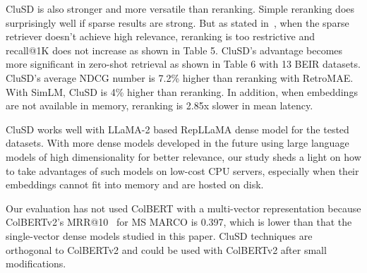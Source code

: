 CluSD is also stronger and more versatile than reranking. 
Simple reranking does surprisingly well if sparse results are strong. But as stated in~\cite{2022CIKM-MacAvaneyGraphReRank,2023SIGIR-LADR},
when the sparse retriever doesn’t achieve high relevance, reranking is too 
restrictive and recall@1K does not increase as shown in Table 5. 
CluSD’s advantage becomes more significant in zero-shot retrieval as shown in Table 6 with 13 BEIR datasets. CluSD’s average NDCG number is 
7.2\% higher than reranking with RetroMAE. With SimLM, CluSD is 4\% higher than reranking.
In addition, when embeddings are not available in memory, reranking is 2.85x slower in mean latency.


CluSD works well  with LLaMA-2 based RepLLaMA dense  model for the tested datasets.
With more dense models  developed in the future using large language models of high dimensionality for better relevance,
our study  sheds a light on how to take advantages of such models on low-cost CPU servers, 
especially when their embeddings cannot fit into memory and are hosted on disk.

Our evaluation has not used ColBERT with a multi-vector representation because 
ColBERTv2's MRR@10~\cite{Santhanam2021ColBERTv2}  for MS MARCO is 0.397, which is lower than that the single-vector dense models studied in this paper. 
CluSD techniques are  orthogonal to ColBERTv2 and could be used with ColBERTv2 after small modifications.


%
